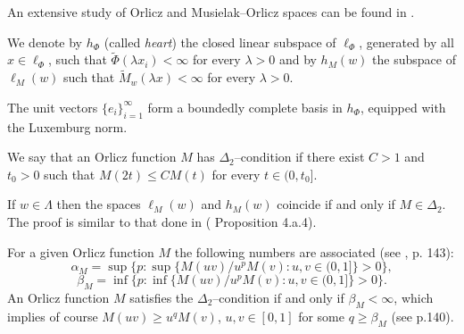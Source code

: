 \documentclass[12pt]{article}
\theoremstyle{thmstyleone}%
\theoremstyle{thmstyletwo}%
\theoremstyle{thmstylethree}%
\begin{document}
An extensive study of Orlicz and Musielak--Orlicz spaces can be found in
\cite{Lindenstrauss-Tzafriri,Musielak}.

We denote by $h_\Phi$ (called {\it heart})  the closed linear subspace of $\ell_\Phi$,
generated by all $x \in \ell_\Phi$, such that $\widetilde\Phi (\lambda
x_i)<\infty$ for every $\lambda >0$ and by $h_M(w)$ the subspace of
$\ell_M(w)$ such that $\widetilde M_w(\lambda x)<\infty$ for every
$\lambda >0$.

The unit vectors $\{e_i\}_{i=1}^\infty$ form a boundedly complete
basis in $h_\Phi$, equipped with the Luxemburg norm.

We say that an Orlicz function $M$ has $\Delta_2$--condition if there exist $C>1$ and
$t_0>0$ such that $M(2t)\le CM(t)$ for every $t\in (0,t_0]$.

If $w\in\Lambda$ then the spaces $\ell_M(w)$ and $h_M(w)$ coincide
if and only if $M\in\Delta_2$. The proof is similar to that done in (\cite{Lindenstrauss-Tzafriri}
Proposition 4.a.4).

For a given Orlicz function $M$ the following numbers are associated
(see \cite{Lindenstrauss-Tzafriri}, p. 143):
$$
\alpha_M=\sup\{p:\sup\{ M(uv)/u^pM(v):u,v\in(0,1]\}>0\},
$$
$$
\beta_M=\inf\{p:\inf\{ M(uv)/u^pM(v):u,v\in(0,1]\}>0\}.
$$
An Orlicz function $M$ satisfies the $\Delta_2$--condition if and only if
$\beta_M<\infty$, which implies of course $M(uv)\geq u^qM(v)$,
$u,v\in [0,1]$ for some $q\geq \beta_M$ (see \cite{Lindenstrauss-Tzafriri} p.140).
\end{document}
